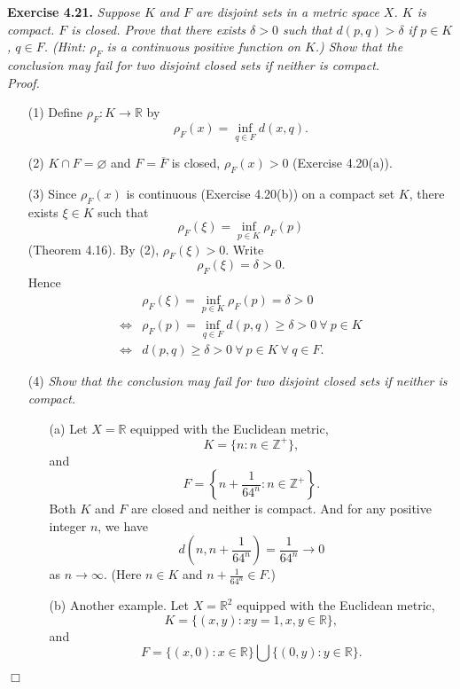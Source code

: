 \documentclass{article}
\begin{document}



\textbf{Exercise 4.21.}
\emph{Suppose $K$ and $F$ are disjoint sets in a metric space $X$.
$K$ is compact.
$F$ is closed.
Prove that there exists $\delta > 0$ such that $d(p,q) > \delta$ if $p \in K$, $q \in F$.
(Hint: $\rho_F$ is a continuous positive function on $K$.)
Show that the conclusion may fail for two disjoint closed sets if neither is compact.} \\

\emph{Proof.}
\begin{enumerate}
\item[(1)]
Define $\rho_F: K \to \mathbb{R}$ by
\[
  \rho_F(x) = \inf_{q \in F} d(x,q).
\]

\item[(2)]
$K \cap F = \varnothing$ and $F = \overline{F}$ is closed,
$\rho_F(x) > 0$ (Exercise 4.20(a)).

\item[(3)]
Since $\rho_F(x)$ is continuous (Exercise 4.20(b)) on a compact set $K$,
there exists $\xi \in K$ such that
\[
  \rho_F(\xi) = \inf_{p \in K} \rho_F(p)
\]
(Theorem 4.16).
By (2), $\rho_F(\xi) > 0$.
Write
\[
  \rho_F(\xi) = \delta > 0.
\]
Hence
\begin{align*}
  &\rho_F(\xi) = \inf_{p \in K} \rho_F(p) = \delta > 0 \\
  \Longleftrightarrow&
  \rho_F(p) = \inf_{q \in F} d(p,q) \geq \delta > 0 \: \forall \: p \in K \\
  \Longleftrightarrow&
  d(p,q) \geq \delta > 0 \: \forall \: p \in K \: \forall \: q \in F.
\end{align*}

\item[(4)]
\emph{Show that the conclusion may fail for two disjoint closed sets if neither is compact.}
\begin{enumerate}
  \item[(a)]
  Let $X = \mathbb{R}$ equipped with the Euclidean metric,
  \[
    K = \{ n : n \in \mathbb{Z}^{+} \},
  \]
  and
  \[
    F = \left\{ n + \frac{1}{64^n} : n \in \mathbb{Z}^{+} \right\}.
  \]
  Both $K$ and $F$ are closed and neither is compact.
  And for any positive integer $n$,
  we have
  \[
    d\left(n, n+\frac{1}{64^n}\right) = \frac{1}{64^n} \to 0
  \]
  as $n \to \infty$.
  (Here $n \in K$ and $n+\frac{1}{64^n} \in F$.)

  \item[(b)]
  Another example.
  Let $X = \mathbb{R}^2$ equipped with the Euclidean metric,
  \[
    K = \{ (x,y) : xy = 1, x, y \in \mathbb{R} \},
  \]
  and
  \[
    F = \{ (x,0) : x \in \mathbb{R} \} \bigcup \{ (0,y) : y \in \mathbb{R} \}.
  \]
\end{enumerate}
\end{enumerate}
$\Box$\\\\
\end{document}
